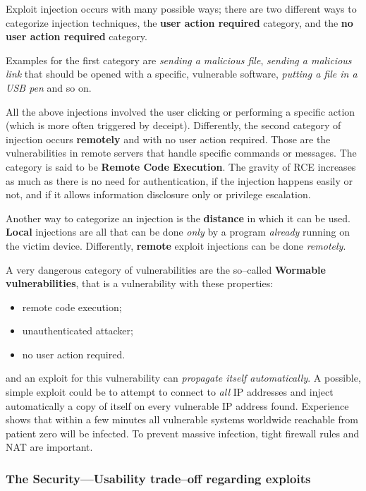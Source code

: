 \documentclass[10pt]{extreport}
\begin{document}
Exploit injection occurs with many possible ways; there are two different ways
to categorize injection techniques, the \textbf{user action required} category,
and the \textbf{no user action required} category.

Examples for the first category are \emph{sending
a malicious file}, \emph{sending a malicious link} that should be opened
with a specific, vulnerable software, \emph{putting a file in a USB pen} and
so on.

All the above injections involved the user clicking or performing a specific
action (which is more often triggered by deceipt). Differently, the second category
of injection occurs \textbf{remotely} and with no user action required. Those are
the vulnerabilities in remote servers that handle specific commands or
messages. The category is said to be \textbf{Remote Code Execution}. The
gravity of RCE increases as much as there is no need for authentication, if the
injection happens easily or not, and if it allows information disclosure only
or privilege escalation.

Another way to categorize an injection is the \textbf{distance} in which it can
be used. \textbf{Local} injections are all that can be done \emph{only} by a
program \emph{already} running on the victim device. Differently,
\textbf{remote} exploit injections can be done \emph{remotely}.

A very dangerous category of vulnerabilities are the so--called
\textbf{Wormable vulnerabilities}, that is a vulnerability with these
properties:
\begin{itemize}
    \item remote code execution;
    \item unauthenticated attacker;
    \item no user action required.
\end{itemize}
and an exploit for this vulnerability can \emph{propagate itself
automatically}. A possible, simple exploit could be to attempt to connect to
\emph{all} IP addresses and inject automatically a copy of itself on every
vulnerable IP address found. Experience shows that within a few minutes all
vulnerable systems worldwide reachable from patient zero will be infected. To
prevent massive infection, tight firewall rules and NAT are important.

\subsubsection{The Security---Usability trade--off regarding exploits}
\end{document}
